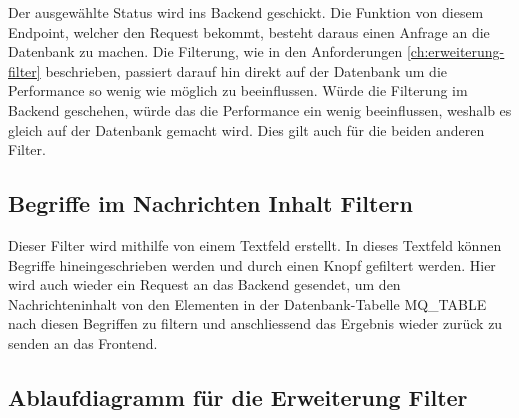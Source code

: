 \noindent Der ausgewählte Status wird ins Backend geschickt. Die Funktion von diesem Endpoint, welcher den Request bekommt, besteht daraus einen Anfrage an die Datenbank zu machen. Die Filterung, wie in den Anforderungen \ref{ch:erweiterung-filter} beschrieben, passiert darauf hin direkt auf der Datenbank um die Performance so wenig wie möglich zu beeinflussen. Würde die Filterung im Backend geschehen, würde das die Performance ein wenig beeinflussen, weshalb es gleich auf der Datenbank gemacht wird. Dies gilt auch für die beiden anderen Filter.

\subsection{Begriffe im Nachrichten Inhalt Filtern}
Dieser Filter wird mithilfe von einem Textfeld erstellt. In dieses Textfeld können Begriffe hineingeschrieben werden und durch einen Knopf gefiltert werden. Hier wird auch wieder ein Request an das Backend gesendet, um den Nachrichteninhalt von den Elementen in der Datenbank-Tabelle MQ\_TABLE nach diesen Begriffen zu filtern und anschliessend das Ergebnis wieder zurück zu senden an das Frontend. 

\subsection{Ablaufdiagramm für die Erweiterung Filter}

\newpage